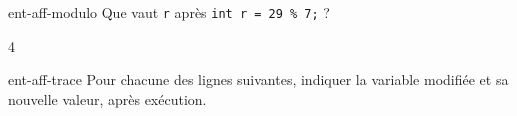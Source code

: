 \begin{question}{ent-aff-modulo}
    Que vaut \texttt{r} après \texttt{int r = 29 \% 7;} ?
    \begin{multicols}{4}
        \begin{reponses}
        \end{reponses}
    \end{multicols}
\end{question}

\begin{question}{ent-aff-trace}
    Pour chacune des lignes suivantes, indiquer la variable modifiée et sa nouvelle valeur, après exécution.
    
\end{question}

